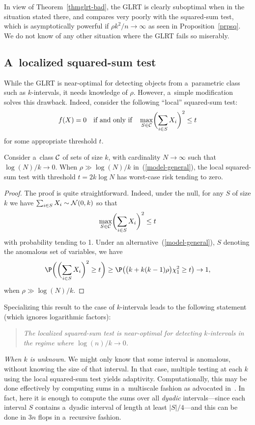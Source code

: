 \documentclass[10pt, oneside]{article}
\begin{document}
In view of Theorem~\ref{thmglrt-bad}, the GLRT is clearly suboptimal
when in
the situation stated there, and compares very poorly with the
squared-sum test, which is asymptotically powerful if $\rho k^2/n \to
\infty$ as seen in Proposition~\ref{prpsq}. We do not know of any
other situation
where the GLRT fails so miserably.

\subsection{A~localized squared-sum test}

While the GLRT is near-optimal for detecting objects from a~parametric
class such as $k$-intervals, it needs knowledge of $\rho$.
However, a~simple modification solves this drawback. Indeed, consider
the following ``local'' squared-sum test:
%
\[
f(X)=0  \quad\mbox{if and only if}\quad
\max_{S \in{\mathcal C}} \biggl(\sum_{i \in S} X_i\biggr)^2 \leq t
\]
%
for some appropriate threshold $t$.
%
\begin{prop} \label{prplocal-sum}
Consider a~class ${\mathcal C}$ of sets of size $k$, with cardinality $N
\to\infty$ such that $\log(N)/k \to0$. When $\rho\gg\log(N)/k$
in~(\ref{model-general}), the local squared-sum test with threshold $t
= 2 k \log N$ has
worst-case
risk tending to zero.
\end{prop}
%
\begin{proof}
The proof is quite straightforward. Indeed, under the null, for any $S$
of size $k$ we have $\sum_{i \in S} X_i \sim{\mathcal N}(0, k)$ so that
%
\[
\max_{S \in\cC} \biggl(\sum_{i \in S} X_i\biggr)^2 \leq t\vadjust{\goodbreak}
\]
%
with probability tending to 1. Under an alternative~(\ref{model-general}), $S$ denoting the anomalous set of variables, we have
%
\[
\P\biggl( \biggl(\sum_{i \in S} X_i\biggr)^2 \ge t\biggr) \ge\P\bigl( \bigl(k + k(k-1) \rho
\bigr) \chi_1^2 \ge t\bigr) \to1,
\]
%
when $\rho\gg\log(N)/k$.
\end{proof}

Specializing this result to the case of $k$-intervals leads to the
following statement (which ignores logarithmic factors):

\begin{quote}
{\normalsize\textit{The localized squared-sum test is near-optimal for
detecting $k$-intervals in the regime where $\log(n)/k \to0$.}}
\end{quote}

\textit{When $k$ is unknown.} We might only know that some interval is
anomalous, without knowing the size of that interval. In that case,
multiple testing at each $k$ using the local squared-sum test yields
adaptivity. Computationally, this may be done effectively by computing
sums in a~multiscale fashion as advocated in~\cite{MGD}. In fact, here
it is enough to compute the sums over all \textit{dyadic}
intervals---since each interval $S$ contains a~dyadic interval of
length at least $|S|/4$---and this can be done in $3 n$ flops in a~recursive fashion.
\end{document}
